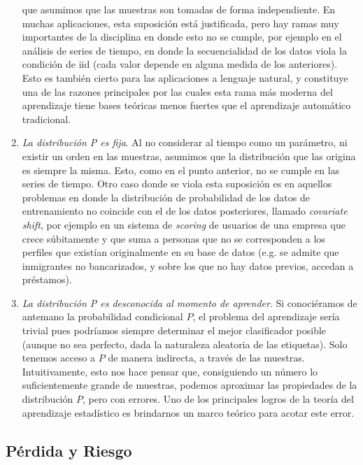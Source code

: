 \documentclass{report}
\begin{document}
\begin{enumerate}
    que asumimos que las muestras son tomadas de forma independiente. En muchas aplicaciones, esta suposición está justificada, pero
    hay ramas muy importantes de la disciplina en donde esto no se cumple, por ejemplo en el análisis de series de tiempo, en donde
    la secuencialidad de los datos viola la condición de iid (cada valor depende en alguna medida de los anteriores). Esto es también 
    cierto para las aplicaciones a lenguaje natural, y constituye una de las razones principales por las cuales esta rama más moderna 
    del aprendizaje tiene bases teóricas menos fuertes que el aprendizaje automático tradicional.
    \item \textit{La distribución P es fija}. Al no considerar al tiempo como un parámetro, ni existir un orden en las muestras, asumimos
    que la distribución que las origina es siempre la misma. Esto, como en el punto anterior, no se cumple en las series de tiempo. Otro
    caso donde se viola esta suposición es en aquellos problemas en donde la distribución de probabilidad de los datos de entrenamiento no
    coincide con el de los datos posteriores, llamado \textit{covariate shift}, por ejemplo en un sistema de \textit{scoring} de usuarios
    de una empresa que crece súbitamente y que suma a personas que no se corresponden a los perfiles que existían originalmente en su base
    de datos (e.g. se admite que inmigrantes no bancarizados, y sobre los que no hay datos previos, accedan a préstamos).
    \item \textit{La distribución P es desconocida al momento de aprender}. Si conociéramos de antemano la probabilidad condicional $P$,
    el problema del aprendizaje sería trivial pues podríamos siempre determinar el mejor clasificador posible (aunque no sea perfecto,
    dada la naturaleza aleatoria de las etiquetas). Solo tenemos acceso a $P$ de manera indirecta, a través de las muestras. Intuitivamente,
    esto nos hace pensar que, consiguiendo un número lo suficientemente grande de muestras, podemos aproximar las propiedades de la distribución
    $P$, pero con errores. Uno de los principales logros de la teoría del aprendizaje estadístico es brindarnos un marco teórico para
    acotar este error.
\end{enumerate}

\subsection{Pérdida y Riesgo}
\end{document}
